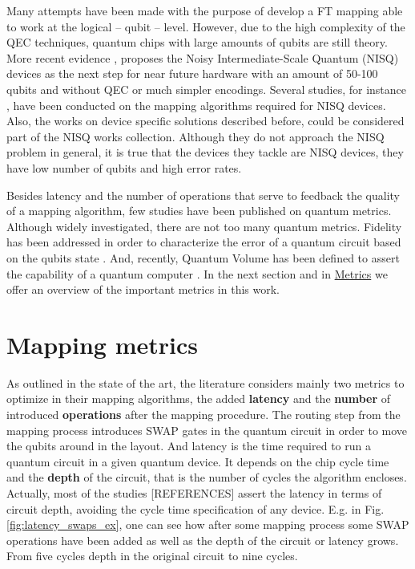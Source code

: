 Many attempts have been made \cite{Dousti_2014,Heckey_2015,hwang18:hierar_system_mappin_large_scale,murphy18:contr,Lao_2018} with the purpose of develop a FT mapping able to work at the logical -- qubit -- level.
However, due to the high complexity of the QEC techniques, quantum chips with large amounts of qubits are still theory.
More recent evidence \cite{Preskill_2018}, proposes the Noisy Intermediate-Scale Quantum (NISQ) devices as the next step for near future hardware with an amount of 50-100 qubits and without QEC or much simpler encodings.
Several studies, for instance \cite{tannu18:case_variab_aware_polic_nisq,paler18:nisq,paler18:influen_initial_qubit_placem_durin}, have been conducted on the mapping algorithms required for NISQ devices.
Also, the works on device specific solutions \cite{zulehner17:effic_method_mappin_quant_circuit,Siraichi_2018,mckay18:qiskit_backen_specif_openq_openp_exper,Dueck_2018,Venturelli_2018} described before, could be considered part of the NISQ works collection.
Although they do not approach the NISQ problem in general, it is true that the devices they tackle are NISQ devices, they have low number of qubits and high error rates.

Besides latency and the number of operations that serve to feedback the quality of a mapping algorithm, few studies have been published on quantum metrics.
Although widely investigated, there are not too many quantum metrics.
Fidelity has been addressed in order to characterize the error of a quantum circuit based on the qubits state \cite{Jozsa_1994,Nielsen_2009}.
And, recently, Quantum Volume has been defined to assert the capability of a quantum computer \cite{Moll_2018}.
In the next section and in \href{chapter-3.org}{Metrics} we offer an overview of the important metrics in this work.

\section*{Mapping metrics}
\label{sec:org7f31969}

As outlined in the state of the art, the literature considers mainly two metrics to optimize in their mapping algorithms, the added \textbf{latency} and the \textbf{number} of introduced \textbf{operations} after the mapping procedure.
The routing step from the mapping process introduces SWAP gates in the quantum circuit in order to move the qubits around in the layout.
And latency is the time required to run a quantum circuit in a given quantum device.
It depends on the chip cycle time and the \textbf{depth} of the circuit, that is the number of cycles the algorithm encloses.
Actually, most of the studies [REFERENCES] assert the latency in terms of circuit depth, avoiding the cycle time specification of any device.
E.g. in Fig. \ref{fig:latency_swaps_ex}, one can see how after some mapping process some SWAP operations have been added as well as the depth of the circuit or latency grows.
From five cycles depth in the original circuit to nine cycles.


